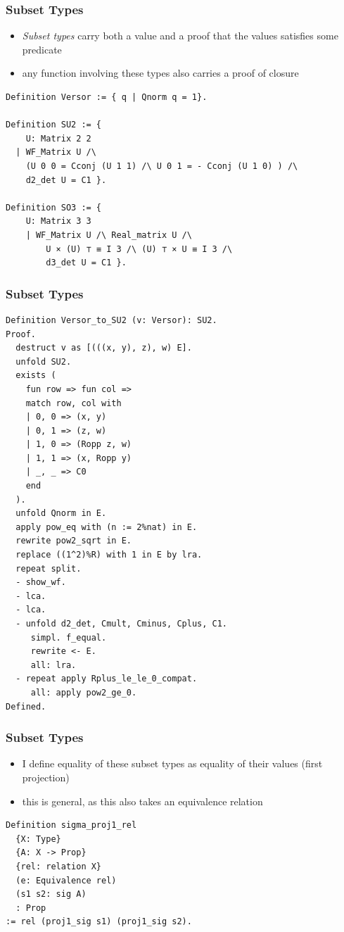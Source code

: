 \documentclass{beamer}
\begin{document}
\begin{frame}[fragile]
\frametitle{Subset Types}

\begin{itemize}
	\item \textit{Subset types} carry both a value and a proof that the values satisfies some predicate
	\item any function involving these types also carries a proof of closure
\end{itemize}

\begin{lstlisting}[language=Coq]
Definition Versor := { q | Qnorm q = 1}.

Definition SU2 := { 
	U: Matrix 2 2
  | WF_Matrix U /\                                                                               
    (U 0 0 = Cconj (U 1 1) /\ U 0 1 = - Cconj (U 1 0) ) /\
    d2_det U = C1 }.

Definition SO3 := { 
	U: Matrix 3 3 
	| WF_Matrix U /\ Real_matrix U /\ 
		U × (U) ⊤ ≡ I 3 /\ (U) ⊤ × U ≡ I 3 /\ 
		d3_det U = C1 }. 
\end{lstlisting}
\end{frame}

\begin{frame}[fragile]
\frametitle{Subset Types}
\begin{lstlisting}[language=Coq, basicstyle=\tiny]
Definition Versor_to_SU2 (v: Versor): SU2.    
Proof.    
  destruct v as [(((x, y), z), w) E].    
  unfold SU2.    
  exists (    
    fun row => fun col =>    
    match row, col with    
    | 0, 0 => (x, y)    
    | 0, 1 => (z, w)    
    | 1, 0 => (Ropp z, w)    
    | 1, 1 => (x, Ropp y)    
    | _, _ => C0    
    end    
  ).    
  unfold Qnorm in E.    
  apply pow_eq with (n := 2%nat) in E.    
  rewrite pow2_sqrt in E.    
  replace ((1^2)%R) with 1 in E by lra.    
  repeat split.    
  - show_wf.    
  - lca.    
  - lca.    
  - unfold d2_det, Cmult, Cminus, Cplus, C1.    
     simpl. f_equal.    
     rewrite <- E.    
     all: lra.    
  - repeat apply Rplus_le_le_0_compat.    
     all: apply pow2_ge_0.    
Defined.
\end{lstlisting}
\end{frame}


\begin{frame}[fragile]
\frametitle{Subset Types}
\begin{itemize}
	\item I define equality of these subset types as equality of their values (first projection)
	\item this is general, as this also takes an equivalence relation
\end{itemize}

\begin{lstlisting}[language=Coq]
Definition sigma_proj1_rel
  {X: Type} 
  {A: X -> Prop} 
  {rel: relation X}
  (e: Equivalence rel)
  (s1 s2: sig A) 
  : Prop 
:= rel (proj1_sig s1) (proj1_sig s2).
\end{lstlisting}
\end{frame}
\end{document}
